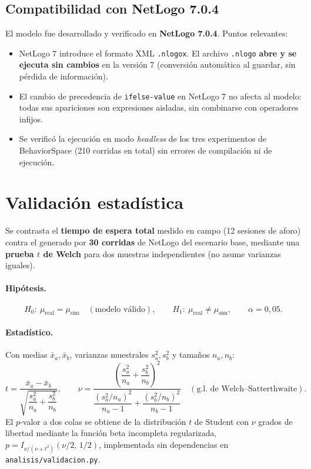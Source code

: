 \documentclass[11pt,a4paper]{article}
\newcommand{\code}[1]{\texttt{#1}}
\begin{document}
\subsection{Compatibilidad con NetLogo 7.0.4}
El modelo fue desarrollado y verificado en \textbf{NetLogo 7.0.4}. Puntos relevantes:
\begin{itemize}[nosep]
  \item NetLogo 7 introduce el formato XML \code{.nlogox}. El archivo \code{.nlogo}
  \textbf{abre y se ejecuta sin cambios} en la versión 7 (conversión automática al
  guardar, sin pérdida de información).
  \item El cambio de precedencia de \code{ifelse-value} en NetLogo 7 no afecta al
  modelo: todas sus apariciones son expresiones aisladas, sin combinarse con
  operadores infijos.
  \item Se verificó la ejecución en modo \emph{headless} de los tres experimentos de
  BehaviorSpace (210 corridas en total) sin errores de compilación ni de ejecución.
\end{itemize}

\section{Validación estadística}

Se contrasta el \textbf{tiempo de espera total} medido en campo (12 sesiones de
aforo) contra el generado por \textbf{30 corridas} de NetLogo del escenario base,
mediante una \textbf{prueba $t$ de Welch} para dos muestras independientes (no asume
varianzas iguales).

\paragraph{Hipótesis.}
\[
H_0:\ \mu_{\text{real}} = \mu_{\text{sim}} \quad(\text{modelo válido}),\qquad
H_1:\ \mu_{\text{real}} \neq \mu_{\text{sim}},\qquad \alpha = 0{,}05.
\]

\paragraph{Estadístico.} Con medias $\bar{x}_a,\bar{x}_b$, varianzas muestrales
$s_a^2,s_b^2$ y tamaños $n_a,n_b$:
\begin{equation}
t = \frac{\bar{x}_a - \bar{x}_b}{\sqrt{\dfrac{s_a^2}{n_a} + \dfrac{s_b^2}{n_b}}},
\qquad
\nu = \frac{\left(\dfrac{s_a^2}{n_a} + \dfrac{s_b^2}{n_b}\right)^{\!2}}
{\dfrac{(s_a^2/n_a)^2}{n_a-1} + \dfrac{(s_b^2/n_b)^2}{n_b-1}}
\quad(\text{g.l. de Welch--Satterthwaite}).
\end{equation}
El $p$-valor a dos colas se obtiene de la distribución $t$ de Student con $\nu$
grados de libertad mediante la función beta incompleta regularizada,
$p = I_{\nu/(\nu+t^2)}\!\left(\nu/2,\,1/2\right)$, implementada sin dependencias en
\code{analisis/validacion.py}.
\end{document}

